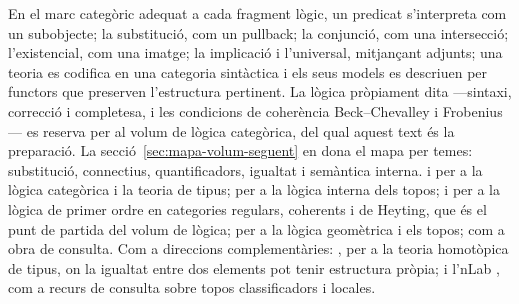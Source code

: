\begin{resumcap}
 En el marc categòric adequat a cada fragment lògic, un predicat s'interpreta com un subobjecte; la substitució, com un pullback; la conjunció, com una intersecció; l'existencial, com una imatge; la implicació i l'universal, mitjançant adjunts; una teoria es codifica en una categoria sintàctica i els seus models es descriuen per functors que preserven l'estructura pertinent.
 La lògica pròpiament dita ---sintaxi, correcció i completesa, i les condicions de coherència Beck--Chevalley i Frobenius--- es reserva per al volum de lògica categòrica, del qual aquest text és la preparació. La secció~\ref{sec:mapa-volum-seguent} en dona el mapa per temes: substitució, connectius, quantificadors, igualtat i semàntica interna.
 \cite{lambekscott} i \cite{jacobs} per a la lògica categòrica i la teoria de tipus; \cite[§13]{streicher} per a la lògica interna dels topos; \cite{makkaireyes} i \cite{pitts} per a la lògica de primer ordre en categories regulars, coherents i de Heyting, que és el punt de partida del volum de lògica; \cite{maclanemoerdijk} per a la lògica geomètrica i els topos; \cite{johnstone} com a obra de consulta. Com a direccions complementàries: \cite{hott}, per a la teoria homotòpica de tipus, on la igualtat entre dos elements pot tenir estructura pròpia; i l'nLab \cite{nlab-classificador,nlab-locale}, com a recurs de consulta sobre topos classificadors i locales.
\end{resumcap}
